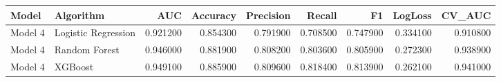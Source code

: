 \begin{tabular}{llrrrrrrr}
\toprule
Model & Algorithm & AUC & Accuracy & Precision & Recall & F1 & LogLoss & CV_AUC \\
\midrule
Model 4 & Logistic Regression & 0.921200 & 0.854300 & 0.791900 & 0.708500 & 0.747900 & 0.334100 & 0.910800 \\
Model 4 & Random Forest & 0.946000 & 0.881900 & 0.808200 & 0.803600 & 0.805900 & 0.272300 & 0.938900 \\
Model 4 & XGBoost & 0.949100 & 0.885900 & 0.809600 & 0.818400 & 0.813900 & 0.262100 & 0.941000 \\
\bottomrule
\end{tabular}
